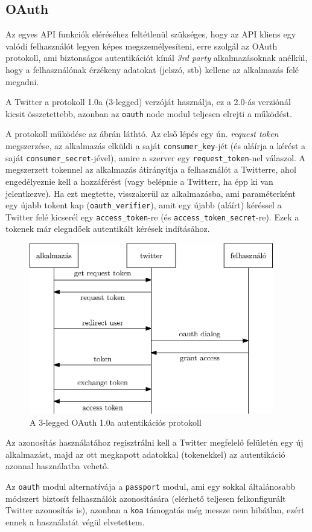 \subsection{OAuth}

Az egyes API funkciók eléréséhez feltétlenül szükséges, hogy az API kliens
egy valódi felhasználót legyen képes megszemélyesíteni, erre szolgál az
OAuth protokoll, ami biztonságos autentikációt kínál \emph{3rd party}
alkalmazásoknak anélkül, hogy a felhasználónak érzékeny adatokat (jelszó, stb)
kellene az alkalmazás felé megadni.

A Twitter a protokoll 1.0a (3-legged)\cite{OAuth} verzóját használja,
ez a 2.0-ás verziónál kicsit összetettebb, azonban az \verb=oauth= node modul
teljesen elrejti a működést.

A protokoll működése az ábrán láthtó.
Az első lépés egy ún. \emph{request token} megszerzése, az alkalmazás
elküldi a saját \verb=consumer_key=-jét (és aláírja a kérést a saját
\verb=consumer_secret=-jével), amire a szerver egy \verb=request_token=-nel
válaszol. A megszerzett tokennel az alkalmazás átirányítja a felhasználót
a Twitterre, ahol engedélyeznie kell a hozzáférést (vagy belépnie a Twitterr,
ha épp ki van jelentkezve). Ha ezt megtette, visszakerül az alkalmazásba,
ami paraméterként egy újabb tokent kap (\verb=oauth_verifier=), amit
egy újabb (aláírt) kéréssel a Twitter felé kicserél egy \verb=access_token=-re
(és \verb=access_token_secret=-re).
Ezek a tokenek már elegndőek autentikált kérések indításához.

\begin{figure}[h!]
  \centering
  \includegraphics[width=0.95\textwidth]{figures/oauth}
  \caption{A 3-legged OAuth 1.0a autentikációs protokoll}
\end{figure}

Az azonosítás használatához regisztrálni kell a Twitter megfelelő felületén
egy új alkalmazást, majd az ott megkapott adatokkal (tokenekkel)
az autentikáció azonnal használatba vehető.

Az \verb=oauth= modul alternatívája a \verb=passport= modul, ami egy sokkal
általánosabb módszert biztosít felhasználók azonosítására (elérhető teljesen
felkonfigurált Twitter azonosítás is), azonban a \verb=koa= támogatás még
messze nem hibátlan, ezért ennek a használatát végül elvetettem.
